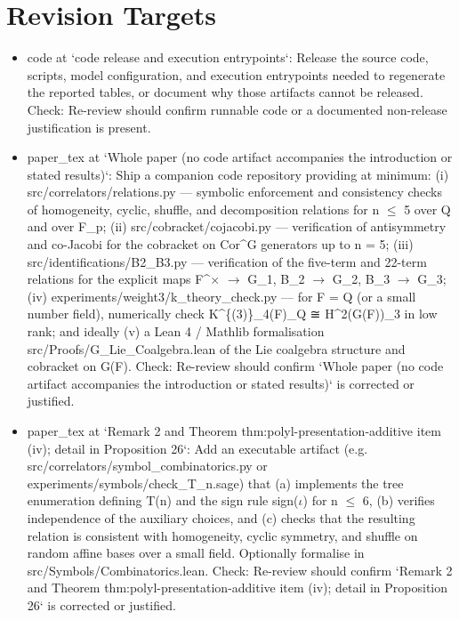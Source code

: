 \documentclass[11pt]{article}
\begin{document}
\section*{Revision Targets}
\begin{itemize}[leftmargin=*]
  \item [open] code at `code release and execution entrypoints`: Release the source code, scripts, model configuration, and execution entrypoints needed to regenerate the reported tables, or document why those artifacts cannot be released. Check: Re-review should confirm runnable code or a documented non-release justification is present.
  \item [open] paper\_tex at `Whole paper (no code artifact accompanies the introduction or stated results)`: Ship a companion code repository providing at minimum: (i) src/correlators/relations.py --- symbolic enforcement and consistency checks of homogeneity, cyclic, shuffle, and decomposition relations for n \ensuremath{\le} 5 over Q and over F\_p; (ii) src/cobracket/cojacobi.py --- verification of antisymmetry and co-Jacobi for the cobracket on Cor\^{}G generators up to n = 5; (iii) src/identifications/B2\_B3.py --- verification of the five-term and 22-term relations for the explicit maps F\^{}\ensuremath{\times} \ensuremath{\to} G\_1, B\_2 \ensuremath{\to} G\_2, B\_3 \ensuremath{\to} G\_3; (iv) experiments/weight3/k\_theory\_check.py --- for F = Q (or a small number field), numerically check K\^{}\{(3)\}\_4(F)\_Q ≅ H\^{}2(G(F))\_3 in low rank; and ideally (v) a Lean 4 / Mathlib formalisation src/Proofs/G\_Lie\_Coalgebra.lean of the Lie coalgebra structure and cobracket on G(F). Check: Re-review should confirm `Whole paper (no code artifact accompanies the introduction or stated results)` is corrected or justified.
  \item [open] paper\_tex at `Remark 2 and Theorem thm:polyl-presentation-additive item (iv); detail in Proposition 26`: Add an executable artifact (e.g. src/correlators/symbol\_combinatorics.py or experiments/symbols/check\_T\_n.sage) that (a) implements the tree enumeration defining T(n) and the sign rule sign(\ensuremath{\iota}) for n \ensuremath{\le} 6, (b) verifies independence of the auxiliary choices, and (c) checks that the resulting relation is consistent with homogeneity, cyclic symmetry, and shuffle on random affine bases over a small field. Optionally formalise in src/Symbols/Combinatorics.lean. Check: Re-review should confirm `Remark 2 and Theorem thm:polyl-presentation-additive item (iv); detail in Proposition 26` is corrected or justified.

\end{itemize}
\end{document}

